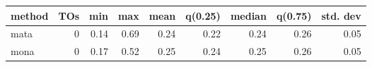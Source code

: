 \begin{tabular}{lrrrrrrrr}
\hline
 method   &   TOs &   min &   max &   mean &   q(0.25) &   median &   q(0.75) &   std. dev \\
\hline
 mata     &  0 &  0.14 &  0.69 &   0.24 &      0.22 &     0.24 &      0.26 &       0.05 \\
 mona     &  0 &  0.17 &  0.52 &   0.25 &      0.24 &     0.25 &      0.26 &       0.05 \\
\hline
\end{tabular}
